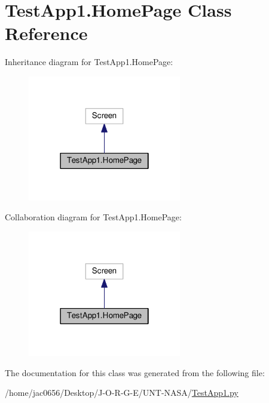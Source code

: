 \hypertarget{classTestApp1_1_1HomePage}{}\section{Test\+App1.\+Home\+Page Class Reference}
\label{classTestApp1_1_1HomePage}


Inheritance diagram for Test\+App1.\+Home\+Page\+:
\nopagebreak
\begin{figure}[H]
\begin{center}
\leavevmode
\includegraphics[width=190pt]{classTestApp1_1_1HomePage__inherit__graph}
\end{center}
\end{figure}


Collaboration diagram for Test\+App1.\+Home\+Page\+:
\nopagebreak
\begin{figure}[H]
\begin{center}
\leavevmode
\includegraphics[width=190pt]{classTestApp1_1_1HomePage__coll__graph}
\end{center}
\end{figure}


The documentation for this class was generated from the following file\+:\begin{DoxyCompactItemize}
\item 
/home/jac0656/\+Desktop/\+J-\/\+O-\/\+R-\/\+G-\/\+E/\+U\+N\+T-\/\+N\+A\+S\+A/\hyperlink{TestApp1_8py}{Test\+App1.\+py}\end{DoxyCompactItemize}
